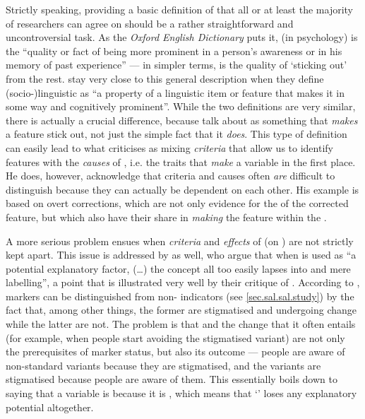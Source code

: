 Strictly speaking, providing a basic definition of  that all or at least the majority of researchers can agree on should be a rather straightforward and uncontroversial task.
As the \emph{Oxford English Dictionary} puts it,  (in psychology) is the ``quality or fact of being more prominent in a person's awareness or in his memory of past experience'' --- in simpler terms,  is the quality of `sticking out' from the rest.
\textcite[81]{kerswillwilliams2002} stay very close to this general description when they define (socio-)linguistic  as ``a property of a linguistic item or feature that makes it in some way  and cognitively prominent''.
While the two definitions are very similar, there is actually a crucial difference, because \citeauthor{kerswillwilliams2002} talk about  as something that \emph{makes} a feature stick out, not just the simple fact that it \emph{does}.
This type of definition can easily lead to what \textcite[cf.][9]{auer2014} criticises as mixing \emph{criteria} that allow us to identify  features with the \emph{causes} of , i.e. the traits that \emph{make} a variable  in the first place.
He does, however, acknowledge that criteria and causes often \emph{are} difficult to distinguish because they can actually be dependent on each other.
His example is based on overt corrections, which are not only evidence for the  of the corrected feature, but which also have their share in \emph{making} the feature  within the .

A more serious problem ensues when \emph{criteria} and \emph{effects} of  (on ) are not strictly kept apart.
This issue is addressed by \textcite[82]{kerswillwilliams2002} as well, who argue that when  is used as ``a potential explanatory factor, (\ldots) the concept all too easily lapses into  and mere labelling'', a point that is illustrated very well by their critique of \textcite{trudgill1986}.
According to \citeauthor{trudgill1986},  markers can be distinguished from non- indicators (see \ref{sec.sal.sal.study}) by the fact that, among other things, the former are stigmatised and undergoing change while the latter are not.
The problem is that  and the change that it often entails (for example, when people start avoiding the stigmatised variant) are not only the prerequisites of marker status, but also its outcome --- people are aware of non-standard variants because they are stigmatised, and the variants are stigmatised because people are aware of them.
This essentially boils down to saying that a variable is  because it is , which means that `' loses any explanatory potential altogether.

